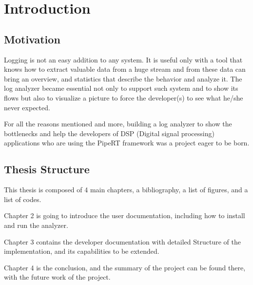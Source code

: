 \chapter{Introduction} %
\label{ch:intro}

\section{Motivation}
Logging is not an easy addition to any system. It is useful only
with a tool that knows how to extract valuable data from a huge
stream and from these data can bring an overview, and
statistics that describe the behavior and analyze it. The log analyzer
became essential not only to support such system and to show its flows
but also to visualize a picture to force the developer(s) to see what
he/she never expected.

For all the reasons mentioned and more, building a log 
analyzer to show the bottlenecks and help the developers of DSP (Digital signal processing)
applications who are using the PipeRT framework was a project eager to be born.

\section{Thesis Structure}
This thesis is composed of 4 main chapters, a bibliography, 
a list of figures, and a list of codes.

Chapter 2 is going to introduce the user documentation, including
how to install and run the analyzer.

Chapter 3 contains the developer documentation with detailed Structure
of the implementation, and its capabilities to be extended.

Chapter 4 is the conclusion, and the summary of the project can be
found there, with the future work of the project.